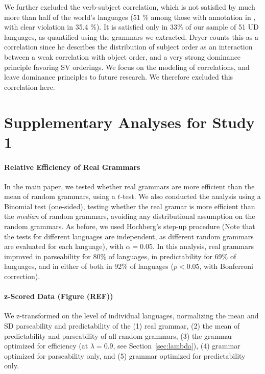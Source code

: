 \documentclass[10pt,twoside,lineno]{article}
\begin{document}
We further excluded the verb-subject correlation, which is not satisfied by much more than half of the world's languages (51 \% among those with annotation in \cite{wals-81}, with clear violation in 35.4 \%).
It is satisfied only in 33\% of our sample of 51 UD languages, as quantified using the grammars we extracted.
Dryer \cite{dryer1992greenbergian} counts this as a correlation since he describes the distribution of subject order as an interaction between a weak correlation with object order, and a very strong dominance principle favoring SV orderings.
We focus on the modeling of correlations, and leave dominance principles to future research.
We therefore excluded this correlation here.




\section{Supplementary Analyses for Study 1}


\paragraph{Relative Efficiency of Real Grammars}
In the main paper, we tested whether real grammars are more efficient than the mean of random grammars, using a $t$-test.
We also conducted the analysis using a Binomial test (one-sided), testing whether the real gramar is more efficient than the \emph{median} of random grammars, avoiding any distributional assumption on the random grammars.
As before, we used Hochberg's step-up procedure (Note that the tests for different languages are independent, as different random grammars are evaluated for each language), with $\alpha=0.05$.
In this analysis, real grammars improved in parseability for 80\% of languages, in predictability for 69\% of languages, and in either of both in 92\% of languages ($p<0.05$, with Bonferroni correction).



\paragraph{z-Scored Data (Figure (REF))}
We z-transformed on the level of individual languages, normalizing the mean and SD parseability and predictability of the (1) real grammar, (2) the mean of predictability and parseability of all random grammars, (3) the grammar optimized for efficiency (at $\lambda =0.9$, see Section~\ref{sec:lambda}), (4) grammar optimized for parseability only, and (5) grammar optimized for predictability only.
\end{document}
